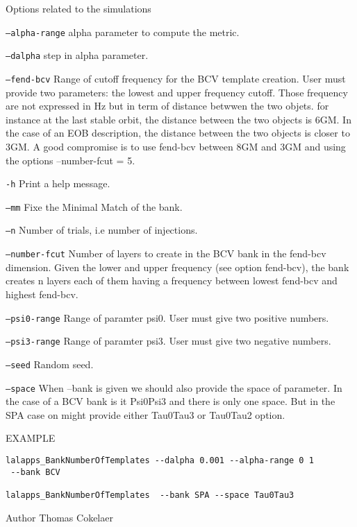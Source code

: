 \begin{entry}
\item[Options related to the simulations]\leavevmode
\begin{entry}
\item[\texttt{--alpha-range}]
alpha parameter to compute the metric.
\item[\texttt{--dalpha}]
step in alpha parameter.
\item[\texttt{--fend-bcv}]
Range of cutoff frequency for the BCV template creation. User must provide two parameters: 
the lowest and upper frequency cutoff. Those frequency are not expressed in Hz but in term
of distance betwwen the two objets. for instance at the last stable orbit, the distance 
between the two objects is 6GM. In the case of an EOB description, the distance between 
the two objects is closer to 3GM. A good compromise is to use fend-bcv between 8GM and 3GM
and using the options --number-fcut = 5. 
\item[\texttt{-h}]
Print a help message.
\item[\texttt{--mm}]
Fixe the Minimal Match of the bank.
\item[\texttt{--n}]
Number of trials, i.e number of injections.
\item[\texttt{--number-fcut}]
Number of layers to create in the BCV bank in the fend-bcv dimension. 
Given the lower and upper frequency (see option fend-bcv), the bank creates
n layers each of them having a frequency between lowest fend-bcv and highest fend-bcv.
\item[\texttt{--psi0-range}]
Range of paramter psi0. User must give two positive numbers.
\item[\texttt{--psi3-range}]
Range of paramter psi3. User must give two negative numbers.
\item[\texttt{--seed}]
Random seed.
\item[\texttt{--space}]
When --bank is given we should also provide the space of parameter. In the case
of a BCV bank is it Psi0Psi3 and there is only one space. But in the SPA case on 
might provide either Tau0Tau3 or Tau0Tau2 option. 

\end{entry}


\item[EXAMPLE]
\begin{verbatim}
lalapps_BankNumberOfTemplates --dalpha 0.001 --alpha-range 0 1 
 --bank BCV

lalapps_BankNumberOfTemplates  --bank SPA --space Tau0Tau3
\end{verbatim}
\item[Author]
Thomas Cokelaer

\end{entry}

